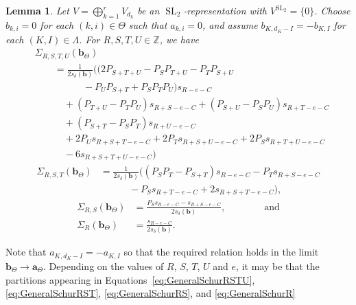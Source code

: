 \documentclass{amsart}
\newtheorem{lemma}[theorem]{Lemma}
\theoremstyle{definition}
\theoremstyle{remark}
\newcommand{\Z}{\mathbb{Z}}
\newcommand{\SL}{\operatorname{SL}}
\newcommand{\bs}{\boldsymbol}
\begin{document}
\begin{lemma}
\label{lem:GeneralSchur}
Let $V = \bigoplus_{k=1}^r V_{d_k}$ be an $\SL_2$-representation with $V^{\SL_2} = \{0\}$.
Choose $b_{k,i} = 0$ for each $(k,i)\in\Theta$ such that $a_{k,i} = 0$, and assume
$b_{K,d_K - I} = -b_{K,I}$ for each $(K,I)\in\Lambda$. For $R, S, T, U\in\Z$, we have
\begin{align}
\label{eq:GeneralSchurRSTU}
    &\Sigma_{R,S,T,U}(\bs{b}_\Theta)
    \\ \nonumber & \quad\quad =
    \frac{1}{ 2 s_{\delta}(\bs{b}) }\Big(
        (2P_{S+T+U} - P_S P_{T+U} - P_T P_{S+U}
    \\ \nonumber &\quad\quad\quad\quad\quad
         - P_U P_{S+T} + P_S P_T P_U)s_{R - e - C}
    \\ \nonumber &\quad\quad\quad
        + (P_{T+U} - P_T P_U) s_{R + S - e - C}
        + (P_{S+U} - P_S P_U) s_{R + T - e - C}
    \\ \nonumber &\quad\quad\quad
        + (P_{S+T} - P_S P_T) s_{R + U - e - C}
    \\ \nonumber &\quad\quad\quad
        + 2 P_U s_{R + S + T - e - C}+ 2 P_T s_{R + S + U - e - C} + 2 P_S s_{R + T + U - e - C}
    \\ \nonumber &\quad\quad\quad
        - 6 s_{R + S + T + U - e - C}
    \Big)
\end{align}
\begin{align}
\label{eq:GeneralSchurRST}
    \Sigma_{R,S,T}(\bs{b}_\Theta)
    &=
    \frac{1}{ 2 s_{\delta}(\bs{b}) }\Big(
        (P_S P_T - P_{S+T})s_{R - e - C} - P_T s_{R + S - e - C}
    \\ \nonumber &\quad\quad\quad
        - P_S s_{R + T - e - C} + 2 s_{R + S + T - e - C} \Big),
\end{align}
\begin{align}
\label{eq:GeneralSchurRS}
    \Sigma_{R,S}(\bs{b}_\Theta)
    &=
    \frac{P_S s_{R - e - C} - s_{R + S - e - C}}{ 2 s_{\delta}(\bs{b}) },
    \quad\quad\quad\quad\mbox{and}
    \\ \label{eq:GeneralSchurR}
    \Sigma_R(\bs{b}_\Theta)
    &=
    \frac{ s_{R - e - C} }{ 2 s_{\delta}(\bs{b}) }.
\end{align}
\end{lemma}
Note that $a_{K,d_K - I} = -a_{K,I}$ so that the required relation holds in the limit $\bs{b}_\Theta\to\bs{a}_\Theta$.
Depending on the values of $R$, $S$, $T$, $U$ and $e$, it may be that the partitions appearing in
Equations~\eqref{eq:GeneralSchurRSTU}, \eqref{eq:GeneralSchurRST}, \eqref{eq:GeneralSchurRS}, and \eqref{eq:GeneralSchurR}
\end{document}
